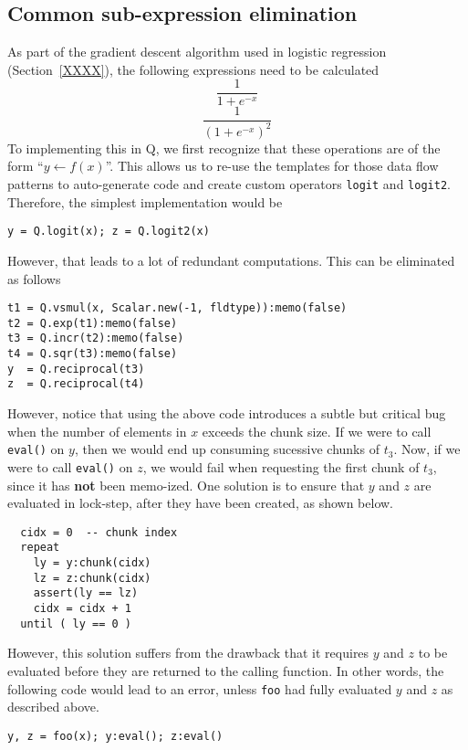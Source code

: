 \subsection{Common sub-expression elimination}

As part of the gradient descent algorithm used in logistic regression
(Section~\ref{XXXX}), the following expressions need to be
calculated 
\begin{equation}
\label{logit}
  \frac{1}{1 + e^{-x}}
\end{equation}
\begin{equation}
\label{logit2}
    \frac{1}{(1 + e^{-x})^2}
\end{equation}
To implementing this in Q, we first 
recognize that these operations are of the form ``\(y \leftarrow f(x)\)''. This
allows us to re-use the templates for those data flow patterns to auto-generate
code and create 
custom operators {\tt logit} and {\tt logit2}. 
Therefore, the simplest implementation would be
\begin{verbatim}
y = Q.logit(x); z = Q.logit2(x)
\end{verbatim}
However, that leads to a lot
of redundant computations.  This can be eliminated as follows
\begin{verbatim}
t1 = Q.vsmul(x, Scalar.new(-1, fldtype)):memo(false)
t2 = Q.exp(t1):memo(false)
t3 = Q.incr(t2):memo(false)
t4 = Q.sqr(t3):memo(false)
y  = Q.reciprocal(t3)
z  = Q.reciprocal(t4)
\end{verbatim}

However, notice that using the above code introduces a subtle but
critical bug when the number of elements in \(x\) exceeds the chunk
size.  If we were to call {\tt eval()} on \(y\), then we would
end up consuming sucessive chunks of \(t_3\). Now, if we were to call
{\tt eval()} on \(z\), we would fail when requesting the first
chunk of \(t_3\), since it has {\bf not} been memo-ized. One solution
is to ensure that \(y\) and \(z\) are evaluated in lock-step, after they have
been created, as shown below.
\begin{verbatim} 
  cidx = 0  -- chunk index
  repeat 
    ly = y:chunk(cidx)
    lz = z:chunk(cidx)
    assert(ly == lz)
    cidx = cidx + 1
  until ( ly == 0 )
\end{verbatim}

However, this solution suffers from the drawback that it requires \(y\) and
\(z\) to be evaluated before they are returned to the calling function.
In other words, the following code would lead to an error, unless {\tt foo} had
fully evaluated \(y\) and \(z\) as described above.
\begin{verbatim}
y, z = foo(x); y:eval(); z:eval()
\end{verbatim}

